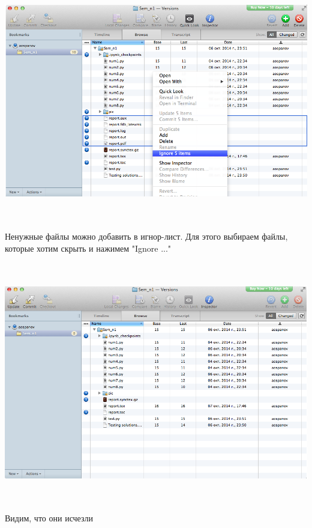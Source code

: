 \documentclass[12pt, a4paper]{article}
\begin{document}
			\begin{center}
				\includegraphics[height=10.5cm]{svn/svn_8.png}

				Ненужные файлы можно добавить в игнор-лист. Для этого выбираем файлы, которые хотим скрыть и нажимем "Ignore ..." \\
			\end{center}

			\begin{center}
				\includegraphics[height=10.5cm]{svn/svn_9.png}

				Видим, что они исчезли \\
				~\newline
			\end{center}
\end{document}
